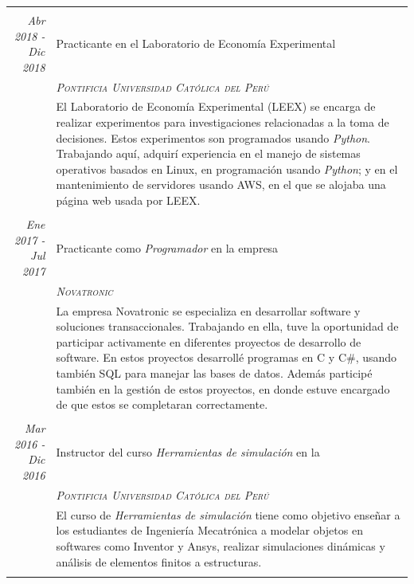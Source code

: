 \documentclass[a4paper,10pt]{article}
\begin{document}
\begin{longtable}{r|p{11cm}}
\\&\\
  \emph{Abr 2018 - Dic 2018} & Practicante en el Laboratorio de Economía Experimental \\&\emph{\textsc{Pontificia Universidad Católica del Per\'u}}\\&\footnotesize{El Laboratorio de Economía Experimental (LEEX) se encarga de realizar experimentos para investigaciones relacionadas a la toma de decisiones. Estos experimentos son programados usando \emph{Python}. Trabajando aquí, adquirí experiencia en el manejo de sistemas operativos basados en Linux, en programación usando \emph{Python}; y en el mantenimiento de servidores usando AWS, en el que se alojaba una página web usada por LEEX.}\\&\\
  
  \emph{Ene 2017 - Jul 2017} & Practicante como  \emph{Programador} en la empresa \\&\emph{\textsc{Novatronic}}\\&\footnotesize{La empresa Novatronic se especializa en desarrollar software y soluciones transaccionales. Trabajando en ella, tuve la oportunidad de participar activamente en diferentes proyectos de desarrollo de software. En estos proyectos desarrollé programas en C y C\#, usando también SQL para manejar las bases de datos. Además participé también en la gestión de estos proyectos, en donde estuve encargado de que estos se completaran correctamente.}\\&\\

 \emph{Mar 2016 - Dic 2016} & Instructor del curso \emph{Herramientas de simulación} en la \\&\emph{\textsc{Pontificia Universidad Católica del Perú}}\\&\footnotesize{El curso de \emph{Herramientas de simulación} tiene como objetivo enseñar a los estudiantes de Ingeniería Mecatrónica a modelar objetos en softwares como Inventor y Ansys, realizar simulaciones dinámicas y análisis de elementos finitos a estructuras.
 }\\&\\
\end{longtable}


\end{document}
